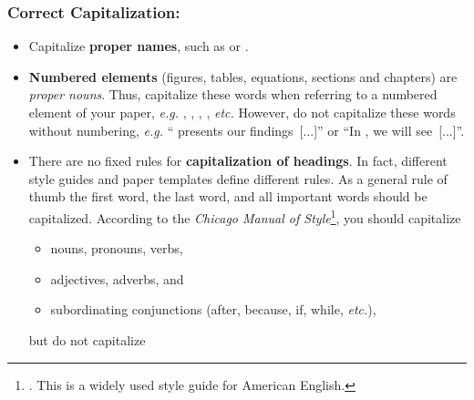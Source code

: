 \documentclass[11pt,a4paper]{article}
\begin{document}
\subsubsection*{Correct Capitalization:}
\begin{itemize} 
  \item Capitalize \textbf{proper names}, such as  or .

  \item \textbf{Numbered elements} (figures, tables, equations, sections and chapters) are \emph{proper nouns}.
  Thus, capitalize these words when referring to a numbered element of your paper, \emph{e.g.} , , , , \emph{etc.}
  However, do not capitalize these words without numbering, \emph{e.g.} `` presents our findings~[...]'' or ``In , we will see~[...]''.
  
  \item There are no fixed rules for \textbf{capitalization of headings}. In fact, different style guides and paper templates define different rules.
  As a general rule of thumb the first word, the last word, and all important words should be capitalized. According to the \emph{Chicago Manual of Style}\footnote{. This is a widely used style guide for American English.}, you should capitalize
  
\vspace{-0.25cm}
\begin{itemize}
\item nouns, pronouns, verbs,
\item adjectives, adverbs, and
\item subordinating conjunctions (after, because, if, while, \emph{etc.}),
\end{itemize}

\vspace{-0.25cm}
but do not capitalize


\end{itemize}
\end{document}
